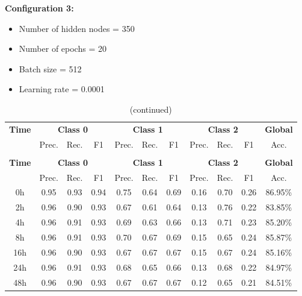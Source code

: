 \documentclass[12pt,oneside]{book} %
\begin{document}
\noindent \textbf{Configuration 3:}
\begin{multicols}{2}
    \begin{itemize}
        \item Number of hidden nodes = 350
        \item Number of epochs = 20
    \end{itemize}
    \begin{itemize}
         \item Batch size = 512
         \item Learning rate = 0.0001
    \end{itemize}
\end{multicols}

\setlength\LTleft{1cm}
\begin{longtable}{ c ccc ccc ccc c}
\caption{Performance metrics of the LNN model for configuration 3} \\
\toprule
\textbf{Time} & \multicolumn{3}{c}{\textbf{Class 0}} & \multicolumn{3}{c}{\textbf{Class 1}} & \multicolumn{3}{c}{\textbf{Class 2}} & \textbf{Global} \\
               & Prec. & Rec. & F1  & Prec. & Rec. & F1   & Prec. & Rec. & F1  & Acc. \\
\midrule
\endfirsthead

\caption[]{(continued)} \\
\toprule
\textbf{Time} & \multicolumn{3}{c}{\textbf{Class 0}} & \multicolumn{3}{c}{\textbf{Class 1}} & \multicolumn{3}{c}{\textbf{Class 2}} & \textbf{Global} \\
               & Prec. & Rec. & F1  & Prec. & Rec. & F1   & Prec. & Rec. & F1  & Acc. \\
\midrule
\endhead

\bottomrule
\endfoot

\bottomrule
\endlastfoot

0h             & 0.95  & 0.93 & 0.94 & 0.75  & 0.64 & 0.69  & 0.16  & 0.70 & 0.26 & 86.95\% \\
2h             & 0.96  & 0.90 & 0.93 & 0.67  & 0.61 & 0.64  & 0.13  & 0.76 & 0.22 & 83.85\% \\
4h             & 0.96  & 0.91 & 0.93 & 0.69  & 0.63 & 0.66  & 0.13  & 0.71 & 0.23 & 85.20\% \\
8h             & 0.96  & 0.91 & 0.93 & 0.70  & 0.67 & 0.69  & 0.15  & 0.65 & 0.24 & 85.87\% \\
16h            & 0.96  & 0.90 & 0.93 & 0.67  & 0.67 & 0.67  & 0.15  & 0.67 & 0.24 & 85.16\% \\
24h            & 0.96  & 0.91 & 0.93 & 0.68  & 0.65 & 0.66  & 0.13  & 0.68 & 0.22 & 84.97\% \\
48h            & 0.96  & 0.90 & 0.93 & 0.67  & 0.67 & 0.67  & 0.12  & 0.65 & 0.21 & 84.51\% \\
\end{longtable}
\end{document}
